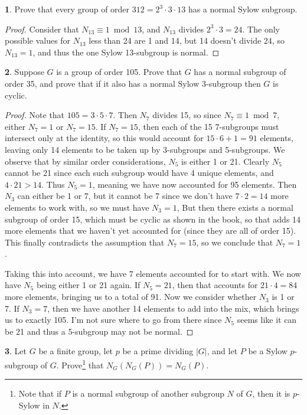 \documentclass[12pt]{article}
\theoremstyle{definition}
\newtheorem{ex}{}
\begin{document}
\begin{ex}
	Prove that every group of order $312 = 2^3\cdot3\cdot13$ has a normal Sylow subgroup.
\end{ex}
\begin{proof}
	Consider that $N_{13} \equiv 1 \bmod 13$, and $N_{13}$ divides $2^3\cdot 3 = 24$.
  The only possible values for $N_{13}$ less than 24 are 1 and 14, but 14 doesn't divide 24, so $N_{13} = 1$, and thus the one Sylow 13-subgroup is normal.
\end{proof}

\begin{ex}
	Suppose $G$ is a group of order 105.  Prove that $G$ has a normal subgroup
	of order 35, and prove that if it also has a normal Sylow 3-subgroup then $G$ is cyclic.
\end{ex}
\begin{proof}
  Note that $105 = 3 \cdot 5 \cdot 7$.
  Then $N_7$ divides 15, so since $N_7 \equiv 1 \bmod 7$, either $N_7 = 1$ or $N_7 = 15$.
  If $N_7 = 15$, then each of the 15 7-subgroups must intersect only at the identity, so this would account for $15 \cdot 6 + 1 = 91$ elements, leaving only 14 elements to be taken up by 3-subgroups and 5-subgroups.
  We observe that by similar order considerations, $N_5$ is either 1 or 21.
  Clearly $N_5$ cannot be 21 since each such subgroup would have 4 unique elements, and $4 \cdot 21 > 14$.
  Thus $N_5 = 1$, meaning we have now accounted for 95 elements.
  Then $N_3$ can either be 1 or 7, but it cannot be 7 since we don't have $7 \cdot 2 = 14$ more elements to work with, so we must have $N_3 = 1$,
  But then there exists a normal subgroup of order 15, which must be cyclic as shown in the book, so that adds 14 more elements that we haven't yet accounted for (since they are all of order 15).
  This finally contradicts the assumption that $N_7 = 15$, so we conclude that $N_7 = 1$.

  Taking this into account, we have 7 elements accounted for to start with.
  We now have $N_5$ being either 1 or 21 again.
  If $N_5 = 21$, then that accounts for $21 \cdot 4 = 84$ more elements, bringing us to a total of 91.
  Now we consider whether $N_3$ is 1 or 7.
  If $N_3 = 7$, then we have another 14 elements to add into the mix, which brings us to exactly 105.
  I'm not sure where to go from there since $N_5$ seems like it can be 21 and thus a 5-subgroup may not be normal.
\end{proof}

\begin{ex}
	Let $G$ be a finite group, let $p$ be a prime dividing $|G|$, and let $P$ be
	a Sylow $p$-subgroup of $G$.  Prove\footnote{Note that if $P$ is a normal subgroup
		of another subgroup $N$ of $G$, then it is $p$-Sylow in $N$.} that $N_G(N_G(P)) = N_G(P)$.

\end{ex}
\end{document}
